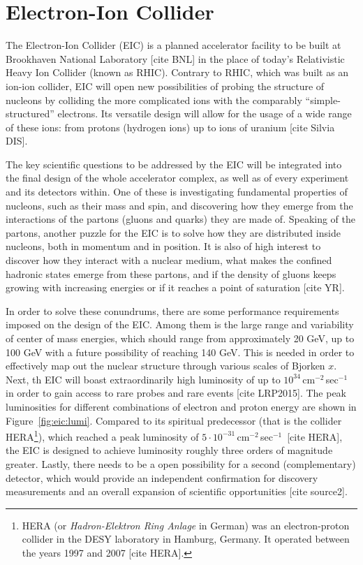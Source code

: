 \chapter{Electron-Ion Collider}\label{cha:EIC} %

The Electron-Ion Collider (EIC) is a planned accelerator facility to be built at Brookhaven National Laboratory [cite BNL] in the place of today's Relativistic Heavy Ion Collider (known as RHIC). Contrary to RHIC, which was built as an ion-ion collider, EIC will open new possibilities of probing the structure of nucleons by colliding the more complicated ions  with the comparably \enquote{simple-structured} electrons. Its versatile design will allow for the usage of a wide range of these ions: from protons (hydrogen ions) up to ions of uranium [cite Silvia DIS].

The key scientific questions to be addressed by the EIC will be integrated into the final design of the whole accelerator complex, as well as of every experiment and its detectors within. One of these is investigating fundamental properties of nucleons, such as their mass and spin, and discovering how they emerge from the interactions of the partons (gluons and quarks) they are made of. Speaking of the partons, another puzzle for the EIC is to solve how they are distributed inside nucleons, both in momentum and in position. It is also of high interest to discover how they interact with a nuclear medium, what makes the confined hadronic states emerge from these partons, and if the density of gluons keeps growing with increasing energies or if it reaches a point of saturation [cite YR].

In order to solve these conundrums, there are some performance requirements imposed on the design of the EIC. Among them is the large range and variability of center of mass energies, which should range from approximately 20 GeV, up to 100 GeV with a future possibility of reaching 140 GeV. This is needed in order to effectively map out the nuclear structure through various scales of Bjorken $x$. Next, th EIC will boast extraordinarily high luminosity of up to $10^{34}$\,cm$^{-2}$\,sec$^{-1}$ in order to gain access to rare probes and rare events [cite LRP2015]. The peak luminosities for different combinations of electron and proton energy are shown in Figure~\ref{fig:eic:lumi}. Compared to its spiritual predecessor (that is the collider HERA\footnote{HERA (or \emph{Hadron-Elektron Ring Anlage} in German) was an electron-proton collider in the DESY laboratory in Hamburg, Germany. It operated between the years 1997 and 2007 [cite HERA].}), which reached a peak luminosity of $5 \cdot 10^{-31}$\,cm$^{-2}$\,sec$^{-1}$~[cite HERA], the EIC is designed to achieve luminosity roughly three orders of magnitude greater. Lastly, there needs to be a open possibility for a second (complementary) detector, which would provide an independent confirmation for discovery measurements and an overall expansion of scientific opportunities [cite source2].

